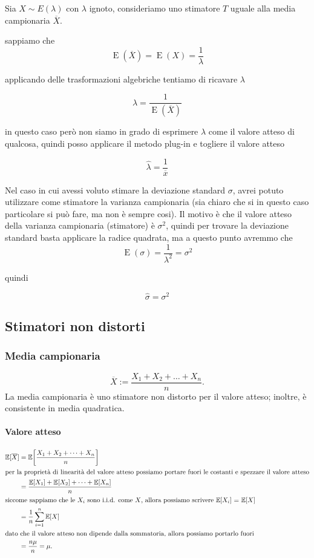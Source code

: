 \begin{esempio}
Sia $X \sim E(\lambda)$ con $\lambda$ ignoto, consideriamo uno stimatore $T$ uguale alla media campionaria $\overline{X}$.

\noindent sappiamo che
$$\operatorname{E}(\overline{X}) = \operatorname{E}(X) = \frac{1}{\lambda}$$

\noindent applicando delle trasformazioni algebriche tentiamo di ricavare $\lambda$

$$\lambda = \frac{1}{\operatorname{E}(\overline{X})}$$

\noindent in questo caso però non siamo in grado di esprimere $\lambda$ come il valore atteso di qualcosa, quindi posso applicare il metodo plug-in e togliere il valore atteso

$$\hat{\lambda} = \frac{1}{\overline{x}}$$

\noindent Nel caso in cui avessi voluto stimare la deviazione standard $\sigma$, avrei potuto utilizzare come stimatore la varianza campionaria (sia chiaro che si in questo caso particolare si può fare, ma non è sempre cosi). Il motivo è che il valore atteso della varianza campionaria (stimatore) è $\sigma^2$, quindi per trovare la deviazione standard basta applicare la radice quadrata, ma a questo punto avremmo che
$$\operatorname{E}(\sigma) = \frac{1}{\lambda^2} = \sigma^2$$

\noindent quindi

$$\hat{\sigma} = \sigma^2$$

\end{esempio}

\subsection{Stimatori non distorti}
\subsubsection{Media campionaria}
\[
\boxed{
\overline X := \frac{X_1 + X_2 + \dots + X_n}{n}}.
\]
La media campionaria è uno stimatore non distorto per il valore atteso; inoltre, è consistente in media quadratica.
\paragraph{Valore atteso}
\begin{align*}
    \mathbb{E}[\overline X] &= \mathbb{E} \! \left[
    \frac {X_1 + X_2 + \dots + X_n}{n}
    \right ]\\
    \intertext{per la proprietà di linearità del valore atteso possiamo portare fuori le costanti e spezzare il valore atteso}
    &= \frac{\mathbb{E}[X_1] + \mathbb{E}[X_2] + \dots + \mathbb{E}[X_n]}{n}\\
    \intertext{siccome sappiamo che le $X_i$ sono i.i.d. come $X$, allora possiamo scrivere $\mathbb E[X_i]$ = $\mathbb {\mathbb{E}}[X]$}
    &= \frac{1}{n} \sum_{i=1}^n\mathbb{E}[X]\\
    \intertext{dato che il valore atteso non dipende dalla sommatoria, allora possiamo portarlo fuori}
    &= \frac{n \mu}{n} = \mu.
\end{align*}


